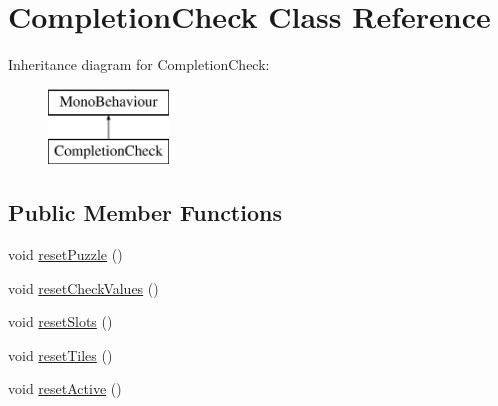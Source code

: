 \hypertarget{class_completion_check}{}\section{Completion\+Check Class Reference}
\label{class_completion_check}
Inheritance diagram for Completion\+Check\+:\begin{figure}[H]
\begin{center}
\leavevmode
\includegraphics[height=2.000000cm]{class_completion_check}
\end{center}
\end{figure}
\subsection*{Public Member Functions}
\begin{DoxyCompactItemize}
\item 
void \hyperlink{class_completion_check_a98191957075533d151dc7698427e60ef}{reset\+Puzzle} ()
\item 
void \hyperlink{class_completion_check_aca7af54ed862a4e68ea33ba918552526}{reset\+Check\+Values} ()
\item 
void \hyperlink{class_completion_check_ad8abae4b94bcebbbc02baa666f7edba1}{reset\+Slots} ()
\item 
void \hyperlink{class_completion_check_a728598fbba43df4fda2542630af671ee}{reset\+Tiles} ()
\item 
void \hyperlink{class_completion_check_a54ea0b1dfecf4892ff9f43b0399c4dda}{reset\+Active} ()
\end{DoxyCompactItemize}
